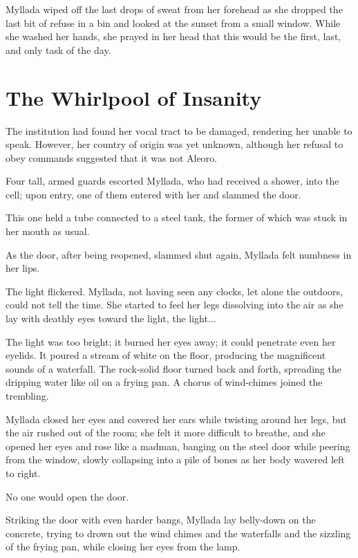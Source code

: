\centeredstars

Myllada wiped off the last drops of sweat from her forehead as she dropped the last bit of refuse in a bin and looked at the sunset from a small window. While she washed her hands, she prayed in her head that this would be the first, last, and only task of the day.

\section{The Whirlpool of Insanity}

The institution had found her vocal tract to be damaged, rendering her unable to speak. However, her country of origin was yet unknown, although her refusal to obey commands suggested that it was not Aleoro.

Four tall, armed guards escorted Myllada, who had received a shower, into the cell; upon entry, one of them entered with her and slammed the door.

This one held a tube connected to a steel tank, the former of which was stuck in her mouth as usual.

As the door, after being reopened, slammed shut again, Myllada felt numbness in her lips.

The light flickered. Myllada, not having seen any clocks, let alone the outdoors, could not tell the time. She started to feel her legs dissolving into the air as she lay with deathly eyes toward the light, the light...

The light was too bright; it burned her eyes away; it could penetrate even her eyelids. It poured a stream of white on the floor, producing the magnificent sounds of a waterfall. The rock-solid floor turned back and forth, spreading the dripping water like oil on a frying pan. A chorus of wind-chimes joined the trembling.

Myllada closed her eyes and covered her ears while twisting around her legs, but the air rushed out of the room; she felt it more difficult to breathe, and she opened her eyes and rose like a madman, banging on the steel door while peering from the window, slowly collapsing into a pile of bones as her body wavered left to right.

No one would open the door.

Striking the door with even harder bangs, Myllada lay belly-down on the concrete, trying to drown out the wind chimes and the waterfalls and the sizzling of the frying pan, while closing her eyes from the lamp.

